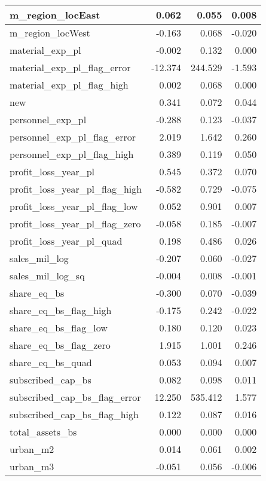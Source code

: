 \begin{table}
\begin{tabular}[t]{l|r|r|r}
\hline
m\_region\_locEast & 0.062 & 0.055 & 0.008\\
\hline
m\_region\_locWest & -0.163 & 0.068 & -0.020\\
\hline
material\_exp\_pl & -0.002 & 0.132 & 0.000\\
\hline
material\_exp\_pl\_flag\_error & -12.374 & 244.529 & -1.593\\
\hline
material\_exp\_pl\_flag\_high & 0.002 & 0.068 & 0.000\\
\hline
new & 0.341 & 0.072 & 0.044\\
\hline
personnel\_exp\_pl & -0.288 & 0.123 & -0.037\\
\hline
personnel\_exp\_pl\_flag\_error & 2.019 & 1.642 & 0.260\\
\hline
personnel\_exp\_pl\_flag\_high & 0.389 & 0.119 & 0.050\\
\hline
profit\_loss\_year\_pl & 0.545 & 0.372 & 0.070\\
\hline
profit\_loss\_year\_pl\_flag\_high & -0.582 & 0.729 & -0.075\\
\hline
profit\_loss\_year\_pl\_flag\_low & 0.052 & 0.901 & 0.007\\
\hline
profit\_loss\_year\_pl\_flag\_zero & -0.058 & 0.185 & -0.007\\
\hline
profit\_loss\_year\_pl\_quad & 0.198 & 0.486 & 0.026\\
\hline
sales\_mil\_log & -0.207 & 0.060 & -0.027\\
\hline
sales\_mil\_log\_sq & -0.004 & 0.008 & -0.001\\
\hline
share\_eq\_bs & -0.300 & 0.070 & -0.039\\
\hline
share\_eq\_bs\_flag\_high & -0.175 & 0.242 & -0.022\\
\hline
share\_eq\_bs\_flag\_low & 0.180 & 0.120 & 0.023\\
\hline
share\_eq\_bs\_flag\_zero & 1.915 & 1.001 & 0.246\\
\hline
share\_eq\_bs\_quad & 0.053 & 0.094 & 0.007\\
\hline
subscribed\_cap\_bs & 0.082 & 0.098 & 0.011\\
\hline
subscribed\_cap\_bs\_flag\_error & 12.250 & 535.412 & 1.577\\
\hline
subscribed\_cap\_bs\_flag\_high & 0.122 & 0.087 & 0.016\\
\hline
total\_assets\_bs & 0.000 & 0.000 & 0.000\\
\hline
urban\_m2 & 0.014 & 0.061 & 0.002\\
\hline
urban\_m3 & -0.051 & 0.056 & -0.006\\
\hline
\end{tabular}
\end{table}